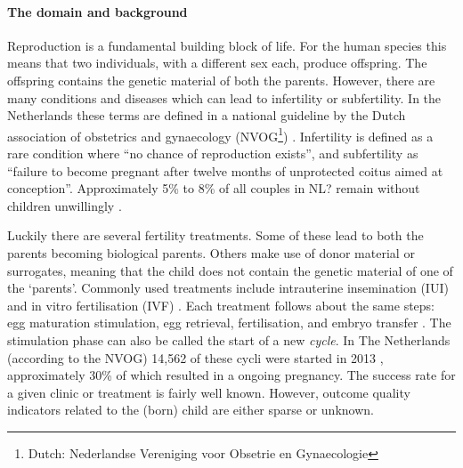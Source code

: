
\paragraph{The domain and background}
Reproduction is a fundamental building block of life.
For the human species this means that two individuals, with a different sex each, produce offspring.
The offspring contains the genetic material of both the parents.
However, there are many conditions and diseases which can lead to infertility or subfertility.
In the Netherlands these terms are defined in a national guideline by the Dutch association of obstetrics and gynaecology (NVOG\footnote{Dutch: Nederlandse Vereniging voor Obsetrie en Gynaecologie}) \cite{subfertilityGuideline}.
Infertility is defined as a rare condition where ``no chance of reproduction exists'', 
and subfertility as ``failure to become pregnant after twelve months of unprotected coitus aimed at conception''.
Approximately 5\% to 8\% of all couples in NL? remain without children unwillingly \cite{cbsStatistics, nhgStatistics}.

Luckily there are several fertility treatments.
Some of these lead to both the parents becoming biological parents. 
Others make use of donor material or surrogates, meaning that the child does not contain the genetic material of one of the `parents'.
Commonly used treatments include intrauterine insemination (IUI) and in vitro fertilisation (IVF) \cite{treatmentExplanation}.
Each treatment follows about the same steps: egg maturation stimulation, egg retrieval, fertilisation, and embryo transfer \cite{treatmentExplanation}.
The stimulation phase can also be called the start of a new \emph{cycle}. In The Netherlands (according to the NVOG) 14,562 of these cycli were started in 2013 \cite{ivfReportNVOG2013}, approximately 30\% of which resulted in a ongoing pregnancy.
The success rate for a given clinic or treatment is fairly well known.
However, outcome quality indicators related to the (born) child are either sparse or unknown.

